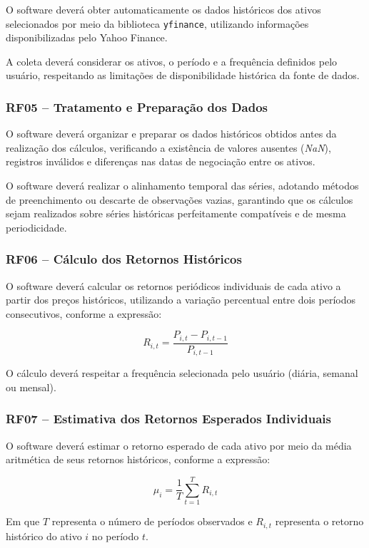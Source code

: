 O software deverá obter automaticamente os dados históricos
dos ativos selecionados por meio da biblioteca
\texttt{yfinance}, utilizando informações disponibilizadas
pelo Yahoo Finance.

A coleta deverá considerar os ativos, o período e a frequência
definidos pelo usuário, respeitando as limitações de
disponibilidade histórica da fonte de dados.

\subsubsection{RF05 -- Tratamento e Preparação dos Dados}

O software deverá organizar e preparar os dados históricos
obtidos antes da realização dos cálculos, verificando a
existência de valores ausentes (\textit{NaN}), registros inválidos e
diferenças nas datas de negociação entre os ativos.

O software deverá realizar o alinhamento temporal das séries, 
adotando métodos de preenchimento ou descarte de observações vazias,
garantindo que os cálculos sejam realizados sobre séries históricas 
perfeitamente compatíveis e de mesma periodicidade.

\subsubsection{RF06 -- Cálculo dos Retornos Históricos}

O software deverá calcular os retornos periódicos individuais de
cada ativo a partir dos preços históricos, utilizando a variação
percentual entre dois períodos consecutivos, conforme a expressão:

\[
R_{i,t} = \frac{P_{i,t}-P_{i,t-1}}{P_{i,t-1}}
\]

O cálculo deverá respeitar a frequência selecionada pelo usuário
(diária, semanal ou mensal).

\subsubsection{RF07 -- Estimativa dos Retornos Esperados Individuais}

O software deverá estimar o retorno esperado de cada ativo por
meio da média aritmética de seus retornos históricos, conforme
a expressão:

\[
\mu_i = \frac{1}{T}\sum_{t=1}^{T}R_{i,t}
\]

Em que \(T\) representa o número de períodos observados e
\(R_{i,t}\) representa o retorno histórico do ativo \(i\)
no período \(t\).

